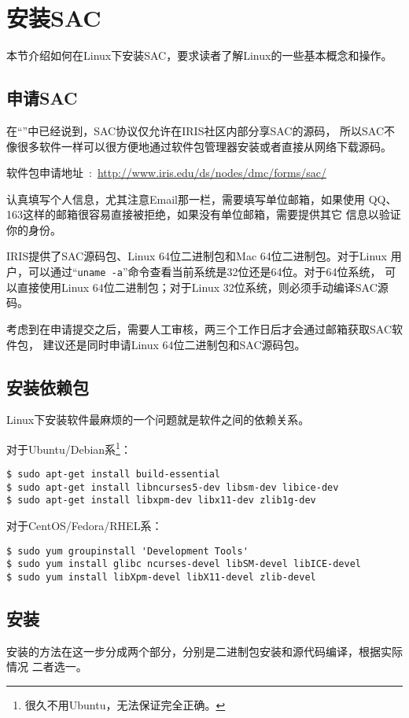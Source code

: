 \section{安装SAC}
\label{sec:sac-install}
本节介绍如何在Linux下安装SAC，要求读者了解Linux的一些基本概念和操作。

\subsection*{申请SAC}
在``''中已经说到，SAC协议仅允许在IRIS社区内部分享SAC的源码，
所以SAC不像很多软件一样可以很方便地通过软件包管理器安装或者直接从网络下载源码。

软件包申请地址~:~\url{http://www.iris.edu/ds/nodes/dmc/forms/sac/}

认真填写个人信息，尤其注意Email那一栏，需要填写单位邮箱，如果使用
QQ、163这样的邮箱很容易直接被拒绝，如果没有单位邮箱，需要提供其它
信息以验证你的身份。

IRIS提供了SAC源码包、Linux 64位二进制包和Mac 64位二进制包。对于Linux
用户，可以通过``\lstinline{uname -a}''命令查看当前系统是32位还是64位。对于64位系统，
可以直接使用Linux 64位二进制包；对于Linux 32位系统，则必须手动编译SAC源码。

考虑到在申请提交之后，需要人工审核，两三个工作日后才会通过邮箱获取SAC软件包，
建议还是同时申请Linux 64位二进制包和SAC源码包。

\subsection*{安装依赖包}
Linux下安装软件最麻烦的一个问题就是软件之间的依赖关系。

对于Ubuntu/Debian系\footnote{很久不用Ubuntu，无法保证完全正确。}：
\begin{lstlisting}[style=Shell]
$ sudo apt-get install build-essential
$ sudo apt-get install libncurses5-dev libsm-dev libice-dev
$ sudo apt-get install libxpm-dev libx11-dev zlib1g-dev
\end{lstlisting}

对于CentOS/Fedora/RHEL系：
\begin{lstlisting}[style=Shell]
$ sudo yum groupinstall 'Development Tools'
$ sudo yum install glibc ncurses-devel libSM-devel libICE-devel
$ sudo yum install libXpm-devel libX11-devel zlib-devel
\end{lstlisting}

\subsection*{安装}
安装的方法在这一步分成两个部分，分别是二进制包安装和源代码编译，根据实际情况
二者选一。
